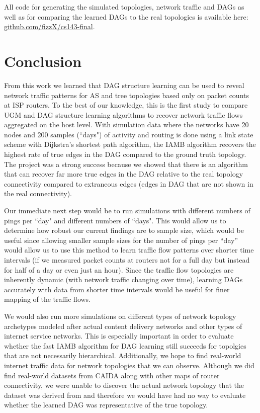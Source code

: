 \documentclass[conference]{IEEEtran}
\begin{document}
All code for generating the simulated topologies, network traffic and DAGs as well as for comparing the learned DAGs to the real topologies is available here: \href{https://github.com/fizzX/cs143-final}{github.com/fizzX/cs143-final}.


\section{Conclusion}

From this work we learned that DAG structure learning can be used to reveal network traffic patterns for AS and tree topologies based only on packet counts at ISP routers. To the best of our knowledge, this is the first study to compare UGM and DAG structure learning algorithms to recover network traffic flows aggregated on the host level. With simulation data where the networks have 20 nodes and 200 samples (``days") of activity and routing is done using a link state scheme with Dijkstra's shortest path algorithm, the IAMB algorithm recovers the highest rate of true edges in the DAG compared to the ground truth topology. The project was a strong success because we showed that there is an algorithm that can recover far more true edges in the DAG relative to the real topology connectivity compared to extraneous edges (edges in DAG that are not shown in the real connectivity).

Our immediate next step would be to run simulations with different numbers of pings per ``day" and different numbers of ``days". This would allow us to determine how robust our current findings are to sample size, which would be useful since allowing smaller sample sizes for the number of pings per ``day” would allow us to use this method to learn traffic flow patterns over shorter time intervals (if we measured packet counts at routers not for a full day but instead for half of a day or even just an hour). Since the traffic flow topologies are inherently dynamic (with network traffic changing over time), learning DAGs accurately with data from shorter time intervals would be useful for finer mapping of the traffic flows.

We would also run more simulations on different types of network topology archetypes modeled after actual content delivery networks and other types of internet service networks. This is especially important in order to evaluate whether the fast IAMB algorithm for DAG learning still succeeds for topolgies that are not necessarily hierarchical. Additionally, we hope to find real-world internet traffic data for network topologies that we can observe. Although we did find real-world datasets from CAIDA along with other maps of router connectivity, we were unable to discover the actual network topology that the dataset was derived from and therefore we would have had no way to evaluate whether the learned DAG was representative of the true topology.
\end{document}
